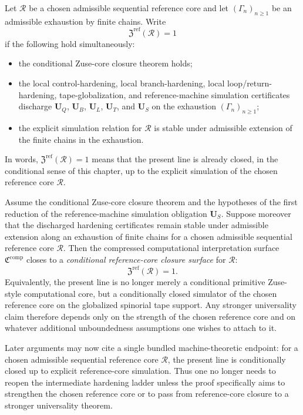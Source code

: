 \begin{definition}
Let $\mathcal R$ be a chosen admissible sequential reference core and let $(\Gamma_n)_{n\ge 1}$ be an admissible exhaustion by finite chains. Write
\[
\mathfrak Z^{\mathrm{ref}}(\mathcal R)=1
\]
if the following hold simultaneously:
\begin{itemize}[leftmargin=2em]
 \item the conditional Zuse-core closure theorem holds;
 \item the local control-hardening, local branch-hardening, local loop/return-hardening, tape-globalization, and reference-machine simulation certificates discharge $\mathbf U_Q$, $\mathbf U_B$, $\mathbf U_L$, $\mathbf U_T$, and $\mathbf U_S$ on the exhaustion $(\Gamma_n)_{n\ge 1}$;
 \item the explicit simulation relation for $\mathcal R$ is stable under admissible extension of the finite chains in the exhaustion.
\end{itemize}
In words, $\mathfrak Z^{\mathrm{ref}}(\mathcal R)=1$ means that the present line is already closed, in the conditional sense of this chapter, up to the explicit simulation of the chosen reference core $\mathcal R$.
\end{definition}

\begin{theorem}
Assume the conditional Zuse-core closure theorem and the hypotheses of the first reduction of the reference-machine simulation obligation $\mathbf U_S$. Suppose moreover that the discharged hardening certificates remain stable under admissible extension along an exhaustion of finite chains for a chosen admissible sequential reference core $\mathcal R$. Then the compressed computational interpretation surface $\mathfrak C^{\mathrm{comp}}$ closes to a \emph{conditional reference-core closure surface} for $\mathcal R$:
\[
\mathfrak Z^{\mathrm{ref}}(\mathcal R)=1.
\]
Equivalently, the present line is no longer merely a conditional primitive Zuse-style computational core, but a conditionally closed simulator of the chosen reference core on the globalized spinorial tape support. Any stronger universality claim therefore depends only on the strength of the chosen reference core and on whatever additional unboundedness assumptions one wishes to attach to it.
\end{theorem}

\begin{corollary}
Later arguments may now cite a single bundled machine-theoretic endpoint: for a chosen admissible sequential reference core $\mathcal R$, the present line is conditionally closed up to explicit reference-core simulation. Thus one no longer needs to reopen the intermediate hardening ladder unless the proof specifically aims to strengthen the chosen reference core or to pass from reference-core closure to a stronger universality theorem.
\end{corollary}


